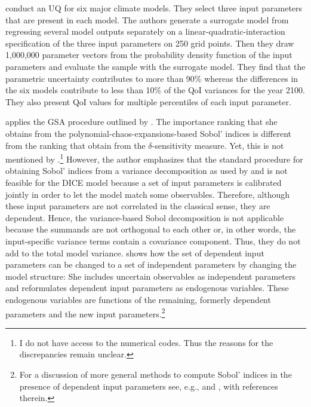 \cite{Gillingham.2015} conduct an UQ for six major climate models. They select three input parameters that are present in each model. The authors generate a surrogate model from regressing several model outputs separately on a linear-quadratic-interaction specification of the three input parameters on 250 grid points. Then they draw 1,000,000 parameter vectors from the probability density function of the input parameters and evaluate the sample with the surrogate model. They find that the parametric uncertainty contributes to more than 90\% whereas the differences in the six models contribute to less than 10\% of the QoI variances for the year 2100. They also present QoI values for multiple percentiles of each input parameter.

\cite{Miftakhova.2018} applies the GSA procedure outlined by \cite{Harenberg.2019}. The importance ranking that she obtains from the polynomial-chaos-expansions-based Sobol' indices is different from the ranking that \cite{Anderson.2014} obtain from the $\delta$-sensitivity measure. Yet, this is not mentioned by \citeauthor{Miftakhova.2018}.\footnote{I do not have access to the numerical codes. Thus the reasons for the discrepancies remain unclear.} However, the author emphasizes that the standard procedure for obtaining Sobol' indices from a variance decomposition as used by \cite{Anderson.2014} and \cite{Butler.2014} is not feasible for the DICE model because a set of input parameters is calibrated jointly in order to let the model match some observables. Therefore, although these input parameters are not correlated in the classical sense, they are dependent. Hence, the variance-based Sobol decomposition is not applicable because the summands are not orthogonal to each other or, in other words, the input-specific variance terms contain a covariance component. Thus, they do not add to the total model variance. \cite{Miftakhova.2018} shows how the set of dependent input parameters can be changed to a set of independent parameters by changing the model structure: She includes uncertain observables as independent parameters and reformulates dependent input parameters as endogenous variables. These endogenous variables are functions of the remaining, formerly dependent parameters and the new input parameters.\footnote{For a discussion of more general methods to compute Sobol' indices in the presence of dependent input parameters see, e.g., \cite{Chastaing.2015} and \cite{Wiederkehr.2018}, with references therein.}

